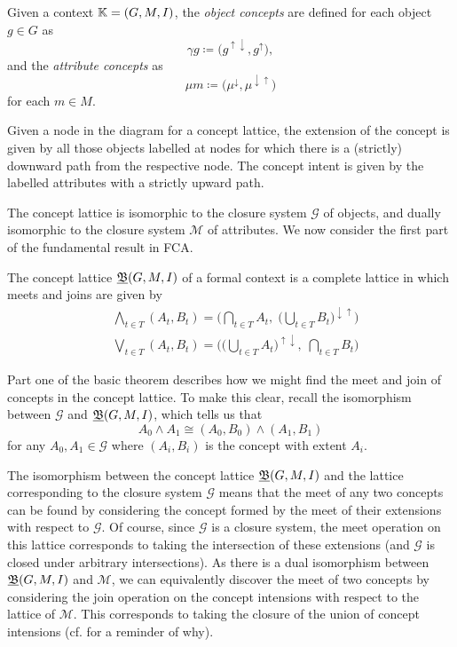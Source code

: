 \begin{definition}
	\label{definition:object-attribute-concepts} 

	Given a context $\mathbb{K} = (G,M,\mathrel{I})$, the \emph{object concepts} are defined for each object $g \in G$ as
	\[
		\gamma g \coloneqq \big(g^{\uparrow \downarrow}, g^{\uparrow}\big),
	\]
	and the \emph{attribute concepts} as
	\[
		\mu m \coloneqq \big(\mu^{\downarrow}, \mu^{\downarrow \uparrow}\big)
	\]
	for each $m \in M$.
\end{definition}

Given a node in the diagram for a concept lattice, the extension of the concept is given by all those objects labelled at
nodes for which there is a (strictly) downward path from the respective node. The concept intent is given by the
labelled attributes with a strictly upward path.

The concept lattice is isomorphic to the closure system $\mathcal{G}$ of objects, and dually isomorphic to the closure system
$\mathcal{M}$ of attributes. We now consider the first part of the fundamental result in FCA.

\begin{theorem}
	\label{theorem:basic-theorem-part1} The concept lattice $\underline{{\mathfrak B}} (G,M,\mathrel{I})$ of a formal context is a complete lattice in which meets
	and joins are given by
	\begin{align*}
		 & \underset{t \in T}\bigwedge (A_{t}, B_{t}) = \Big( \underset{t \in T}\bigcap A_{t}, \; \big(\underset{t \in T}\bigcup B_{t}\big)^{\downarrow \uparrow}\Big) \\
		 & \underset{t \in T}\bigvee (A_{t}, B_{t}) = \Big( \big(\underset{t \in T}\bigcup A_{t}\big)^{\uparrow \downarrow},\; \underset{t \in T}\bigcap B_{t}\Big)
	\end{align*}
\end{theorem}

Part one of the basic theorem describes how we might find the meet and join of concepts in the concept lattice. To make
this clear, recall the isomorphism between $\mathcal{G}$ and $\underline{{\mathfrak B}} (G,M,\mathrel{I})$, which tells us that
\[
	A_{0}\wedge A_{1}\cong (A_{0},B_{0}) \wedge (A_{1},B_{1})
\]
for any $A_{0},A_{1}\in \mathcal{G}$ where $(A_{i},B_{i})$ is the concept with extent $A_{i}$.

The isomorphism between the concept lattice $\underline{{\mathfrak B}} (G,M,\mathrel{I})$ and the lattice corresponding to the closure system $\mathcal{G}$
means that the meet of any two concepts can be found by considering the concept formed by the meet of their extensions
with respect to $\mathcal{G}$. Of course, since $\mathcal{G}$ is a closure system, the meet operation on this lattice corresponds
to taking the intersection of these extensions (and $\mathcal{G}$ is closed under arbitrary intersections). As there is
a dual isomorphism between $\underline{{\mathfrak B}} (G,M,\mathrel{I})$ and $\mathcal{M}$, we can equivalently discover the meet of two concepts by considering
the join operation on the concept intensions with respect to the lattice of $\mathcal{M}$. This corresponds to taking
the closure of the union of concept intensions (cf.  for a reminder of why).

